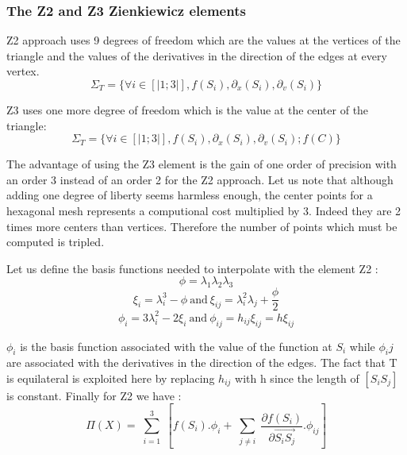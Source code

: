 \documentclass[proc]{edpsmath}
\begin{document}
\subsubsection{The Z2 and Z3 Zienkiewicz elements}
Z2 approach uses 9 degrees of freedom which are the values at the vertices of the triangle and the values of the derivatives in the direction of the edges at every vertex.
\begin{equation*}
 \Sigma_T = \lbrace \forall i \in [|1;3|], f(S_i),\partial_x(S_i),\partial_v(S_i) \rbrace 
\end{equation*}

 \noindent Z3 uses one more degree of freedom which is the value at the center of the triangle:
\begin{equation*}
 \Sigma_T = \lbrace \forall i \in [|1;3|], f(S_i),\partial_x(S_i),\partial_v(S_i); f(C) \rbrace 
\end{equation*}

 \noindent The advantage of using the Z3 element is the gain of one order of precision with an order 3 instead of an order 2 for the Z2 approach. Let us note that although adding one degree of liberty seems harmless enough, the center points for a hexagonal mesh represents a computional cost multiplied by 3. Indeed they are  2 times more centers than vertices. Therefore the number of points which must be computed is tripled. 
 
Let us define the basis functions needed to interpolate with the element Z2 : 
\begin{equation*}
\phi = \lambda_1 \lambda_2 \lambda_3 
\end{equation*}
\begin{equation*}
\xi _i= \lambda_i^3 - \phi ~\text{and}~ \xi_{ij}= \lambda_{i}^2 \lambda_j + \frac{\phi}{2} 
\end{equation*}
\begin{equation*}
\phi_i = 3\lambda_{i}^2 -2 \xi_i ~\text{and} ~\phi_{ij} = h_{ij} \xi_{ij}=h \xi_{ij}
\end{equation*}


\noindent $\phi_i$ is the basis function associated with the value of the function at $S_i$ while $\phi_ij$ are associated with the derivatives in the direction of the edges.    
The fact that T is equilateral is exploited here by replacing $h_{ij}$ with h since the length of $ [S_iS_j]$ is constant. Finally for Z2 we have :
\begin{equation*}
 \Pi (X) = \sum \limits_{\substack{i=1 }}^{3}{ [f(S_i).\phi_i + \sum \limits_{\substack{j\neq i }}^{}{ \frac{\partial f(S_i)}{\partial  \overrightarrow{ S_i S_j } }.\phi_{ij} } ] } 
\end{equation*}
\end{document}
